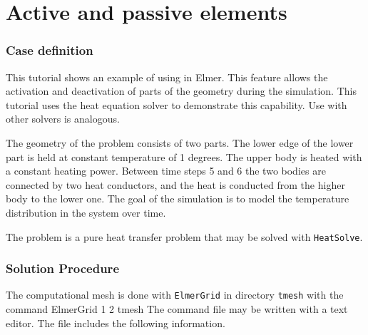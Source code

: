 \chapter{Active and passive elements}


\subsection*{Case definition}

This tutorial shows an example of using  in
Elmer. This feature allows the activation and deactivation of
parts of the geometry during the simulation. This tutorial uses the
heat equation solver to demonstrate this capability. Use with other
solvers is analogous.

The geometry of the problem consists of two parts. The lower edge of
the lower part is held at constant temperature of 1 degrees. The upper
body is heated with a constant heating power. Between time steps 5 and
6 the two bodies are connected by two heat conductors, and the heat is
conducted from the higher body to the lower one. The goal of the
simulation is to model the temperature distribution in the system over
time. 

The problem is a pure heat transfer problem that may be solved
with \texttt{HeatSolve}. 


\subsection*{Solution Procedure}

The computational mesh is done with \texttt{ElmerGrid} in directory \texttt{tmesh} 
with the command 
%
\ttbegin
ElmerGrid 1 2 tmesh
\ttend
%
The command file may be written with a text editor. The file includes
the following information. 

